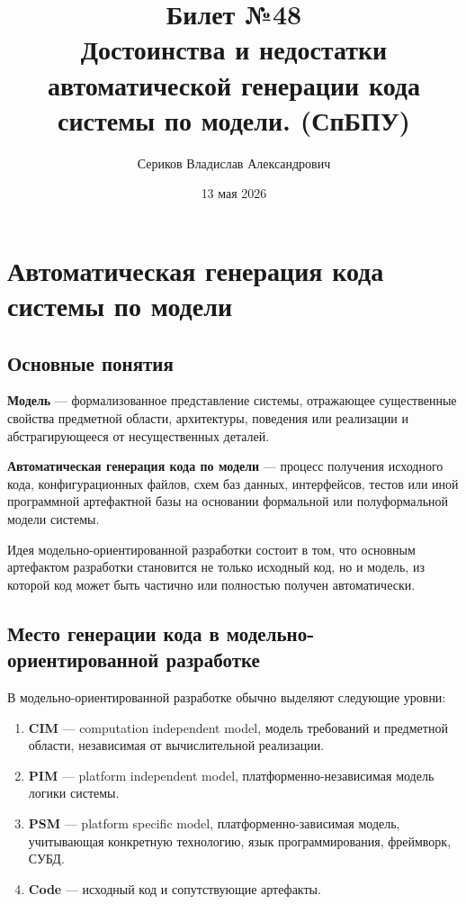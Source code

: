 \documentclass[12pt,a4paper]{article}
\title{Билет №48 \\ \small Достоинства и недостатки автоматической генерации кода системы по модели. (СпБПУ)}
\author{Сериков Владислав Александрович}
\date{13 мая 2026}
\begin{document}
\maketitle
\tableofcontents
\newpage

\section{Автоматическая генерация кода системы по модели}

\subsection{Основные понятия}

\textbf{Модель} --- формализованное представление системы, отражающее существенные свойства предметной области, архитектуры, поведения или реализации и абстрагирующееся от несущественных деталей.

\textbf{Автоматическая генерация кода по модели} --- процесс получения исходного кода, конфигурационных файлов, схем баз данных, интерфейсов, тестов или иной программной артефактной базы на основании формальной или полуформальной модели системы.

Идея модельно-ориентированной разработки состоит в том, что основным артефактом разработки становится не только исходный код, но и модель, из которой код может быть частично или полностью получен автоматически.

\subsection{Место генерации кода в модельно-ориентированной разработке}

В модельно-ориентированной разработке обычно выделяют следующие уровни:

\begin{enumerate}
    \item \textbf{CIM} --- computation independent model, модель требований и предметной области, независимая от вычислительной реализации.
    \item \textbf{PIM} --- platform independent model, платформенно-независимая модель логики системы.
    \item \textbf{PSM} --- platform specific model, платформенно-зависимая модель, учитывающая конкретную технологию, язык программирования, фреймворк, СУБД.
    \item \textbf{Code} --- исходный код и сопутствующие артефакты.
\end{enumerate}
\end{document}
